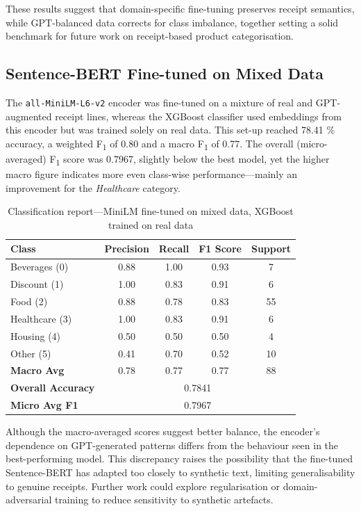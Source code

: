 \documentclass{SGGW-thesis-EN}
\begin{document}
\noindent
These results suggest that domain-specific fine-tuning preserves receipt semantics, while GPT-balanced data corrects
for class imbalance, together setting a solid benchmark for future work on receipt-based product categorisation.

\subsection{Sentence-BERT Fine-tuned on Mixed Data}
The \texttt{all-MiniLM-L6-v2} encoder was fine-tuned on a mixture of real and GPT-augmented receipt lines, whereas the
XGBoost classifier used embeddings from this encoder but was trained solely on real data. This set-up reached
78.41 \% accuracy, a weighted F\textsubscript{1} of 0.80 and a macro F\textsubscript{1} of 0.77. The overall
(micro-averaged) F\textsubscript{1} score was 0.7967, slightly below the best model, yet the higher macro figure
indicates more even class-wise performance—mainly an improvement for the \emph{Healthcare} category.

\begin{table}[h]
  \centering
  \caption{Classification report—MiniLM fine-tuned on mixed data, XGBoost trained on real data}
  \label{tab:finetuned_st_real_clf_report}
  \begin{tabularx}{\textwidth}{lcccc}
    \toprule
    \textbf{Class} & \textbf{Precision} & \textbf{Recall} & \textbf{F1 Score} & \textbf{Support} \\
    \midrule
    Beverages (0)  & 0.88 & 1.00 & 0.93 & 7  \\
    Discount  (1)  & 1.00 & 0.83 & 0.91 & 6  \\
    Food      (2)  & 0.88 & 0.78 & 0.83 & 55 \\
    Healthcare (3) & 1.00 & 0.83 & 0.91 & 6  \\
    Housing    (4) & 0.50 & 0.50 & 0.50 & 4  \\
    Other      (5) & 0.41 & 0.70 & 0.52 & 10 \\
    \midrule
    \textbf{Macro Avg}        & 0.78 & 0.77 & 0.77 & 88 \\
    \textbf{Overall Accuracy} & \multicolumn{4}{c}{0.7841} \\
    \textbf{Micro Avg F1}     & \multicolumn{4}{c}{0.7967} \\
    \bottomrule
  \end{tabularx}
\end{table}
\noindent Although the macro-averaged scores suggest better balance, the encoder’s dependence on GPT-generated patterns differs
from the behaviour seen in the best-performing model. This discrepancy raises the possibility that the fine-tuned
Sentence-BERT has adapted too closely to synthetic text, limiting generalisability to genuine receipts. Further work
could explore regularisation or domain-adversarial training to reduce sensitivity to synthetic artefacts.
\end{document}
